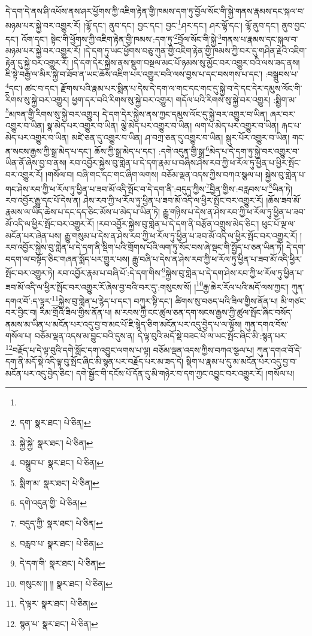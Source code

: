 དེ་དག་དེ་ནས་ཤི་འཕོས་ནས་ཤར་ཕྱོགས་ཀྱི་འཇིག་རྟེན་གྱི་ཁམས་དག་ཏུ་བྱོལ་སོང་གི་སྐྱེ་གནས་རྣམས་དང་སྐལ་བ་མཉམ་པར་སྐྱེ་བར་འགྱུར་རོ། །ལྷོ་དང་། ནུབ་དང་། བྱང་དང་། བྱང་\footnote{}ཤར་དང་། ཤར་ལྷོ་དང་། ལྷོ་ནུབ་དང་། ནུབ་བྱང་དང་། འོག་དང་། སྟེང་གི་ཕྱོགས་ཀྱི་འཇིག་རྟེན་གྱི་ཁམས་:དག་ཏུ་\footnote{དག་  སྣར་ཐང་།  པེ་ཅིན། }བྱོལ་སོང་གི་སྐྱེ་\footnote{སྐྱེ་སྐྱེ་  སྣར་ཐང་།  པེ་ཅིན། }གནས་པ་རྣམས་དང་སྐལ་བ་མཉམ་པར་སྐྱེ་བར་འགྱུར་རོ། །དེ་དག་ཏུ་ཡང་ཕྱོགས་བཅུ་ཀུན་གྱི་འཇིག་རྟེན་གྱི་ཁམས་ཀྱི་བར་དུ་གཤིན་རྗེའི་འཇིག་རྟེན་དུ་སྐྱེ་བར་འགྱུར་རོ། །དེ་དག་དེར་སྐྱེས་ནས་སྡུག་བསྔལ་མང་པོ་ཉམས་སུ་མྱོང་བར་འགྱུར་བའི་ལས་ཟད་ནས། ཇི་སྟེ་བརྒྱ་ལ་མིར་སྐྱེ་བ་ཐོབ་ན་ཡང་ཆོས་འཇིག་པར་འགྱུར་བའི་ལས་བྱས་པ་དང་བསགས་པ་དང་། :བསྒྲུབས་པ་\footnote{བསྒྲུབ་པ་  སྣར་ཐང་།  པེ་ཅིན། }དང་། ཚང་བ་དང་། རྫོགས་པའི་རྣམ་པར་སྨིན་པ་དེས་དེ་དག་ལ་གང་དང་གང་དུ་སྐྱེ་བ་དེ་དང་དེར་དམུས་ལོང་གི་རིགས་སུ་སྐྱེ་བར་འགྱུར། ཕྱག་དར་བའི་རིགས་སུ་སྐྱེ་བར་འགྱུར། གདོལ་པའི་རིགས་སུ་སྐྱེ་བར་འགྱུར། :སྨྱིག་མ་\footnote{སྨིག་མ་  སྣར་ཐང་།  པེ་ཅིན། }མཁན་གྱི་རིགས་སུ་སྐྱེ་བར་འགྱུར། དེ་དག་དེར་སྐྱེས་ནས་ཀྱང་དམུས་ལོང་དུ་སྐྱེ་བར་འགྱུར་བ་ཡིན། ཞར་བར་འགྱུར་བ་ཡིན། སྣ་མེད་པར་འགྱུར་བ་ཡིན། ལྕེ་མེད་པར་འགྱུར་བ་ཡིན། ལག་པ་མེད་པར་འགྱུར་བ་ཡིན། རྐང་པ་མེད་པར་འགྱུར་བ་ཡིན། མཛེ་ཅན་དུ་འགྱུར་བ་ཡིན། ཤ་བཀྲ་ཅན་དུ་འགྱུར་བ་ཡིན། སྒུར་པོར་འགྱུར་བ་ཡིན། གང་ན་སངས་རྒྱས་ཀྱི་སྒྲ་མེད་པ་དང་། ཆོས་ཀྱི་སྒྲ་མེད་པ་དང་། :དགེ་འདུན་གྱི་སྒྲ་\footnote{དགེ་འདུན་གྱི་  པེ་ཅིན། }མེད་པ་དེ་དག་ཏུ་སྐྱེ་བར་འགྱུར་བ་ཡིན་ནོ་ཞེས་བྱ་བ་ནས། རབ་འབྱོར་སྐྱེས་བུ་གླེན་པ་དེ་དག་རྣམ་པ་བཞིས་ཤེས་རབ་ཀྱི་ཕ་རོལ་ཏུ་ཕྱིན་པ་ཕྱིར་སྤོང་བར་འགྱུར་རོ། །གསོལ་བ། བཞི་གང་དང་གང་ཞིག་ལགས། བཅོམ་ལྡན་འདས་ཀྱིས་བཀའ་སྩལ་པ། སྐྱེས་བུ་གླེན་པ་གང་ཤེས་རབ་ཀྱི་ཕ་རོལ་ཏུ་ཕྱིན་པ་ཟབ་མོ་འདི་སྤོང་བ་དེ་དག་ནི་:བདུད་ཀྱིས་\footnote{བདུད་ཀྱི་  སྣར་ཐང་།  པེ་ཅིན། }བྱིན་གྱིས་:བརླབས་པ་\footnote{བརླབ་པ་  སྣར་ཐང་།  པེ་ཅིན། }ཡིན་ཏེ། རབ་འབྱོར་རྒྱུ་དང་པོ་དེས་ན། ཤེས་རབ་ཀྱི་ཕ་རོལ་ཏུ་ཕྱིན་པ་ཟབ་མོ་འདི་ལ་ཕྱིར་སྤོང་བར་འགྱུར་རོ། །ཆོས་ཟབ་མོ་རྣམས་ལ་ཡིད་ཆེས་པ་དང་དད་ཅིང་མོས་པ་མེད་པ་ཡིན་ཏེ། རྒྱུ་གཉིས་པ་དེས་ན་ཤེས་རབ་ཀྱི་ཕ་རོལ་ཏུ་ཕྱིན་པ་ཟབ་མོ་འདི་ལ་ཕྱིར་སྤོང་བར་འགྱུར་རོ། །རབ་འབྱོར་སྐྱེས་བུ་གླེན་པ་དེ་དག་ནི་བརྩོན་འགྲུས་མེད་ཅིང་། ཕུང་པོ་ལྔ་ལ་མངོན་པར་ཞེན་པས། རྒྱུ་གསུམ་པ་དེས་ན་ཤེས་རབ་ཀྱི་ཕ་རོལ་ཏུ་ཕྱིན་པ་ཟབ་མོ་འདི་ལ་ཕྱིར་སྤོང་བར་འགྱུར་རོ། །རབ་འབྱོར་སྐྱེས་བུ་གླེན་པ་དེ་དག་ནི་སྡིག་པའི་གྲོགས་པོའི་ལག་ཏུ་སོང་བས་ཞེ་སྡང་གི་སྤྱོད་པ་ཅན་ཡིན་ཏེ། དེ་དག་བདག་ལ་བསྟོད་ཅིང་གཞན་སྨོད་པར་གྱུར་པས། རྒྱུ་བཞི་པ་དེས་ན་ཤེས་རབ་ཀྱི་ཕ་རོལ་ཏུ་ཕྱིན་པ་ཟབ་མོ་འདི་ཕྱིར་སྤོང་བར་འགྱུར་ཏེ། རབ་འབྱོར་རྣམ་པ་བཞི་པོ་:དེ་དག་གིས་\footnote{དེ་དག་གི་  སྣར་ཐང་།  པེ་ཅིན། }སྐྱེས་བུ་གླེན་པ་དེ་དག་ཤེས་རབ་ཀྱི་ཕ་རོལ་ཏུ་ཕྱིན་པ་ཟབ་མོ་འདི་ལ་ཕྱིར་སྤོང་བར་འགྱུར་རོ་ཞེས་བྱ་བའི་བར་དུ་:གསུངས་སོ། །\footnote{གསུངས་།། །།  སྣར་ཐང་།  པེ་ཅིན། }རྒྱ་ཆེར་རོལ་པའི་མདོ་ལས་ཀྱང་། ཀུན་དགའ་བོ་:ད་ལྟར་\footnote{དེ་ལྟར་  སྣར་ཐང་།  པེ་ཅིན། }སྐྱེས་བུ་གླེན་པ་རྙེད་པ་དང་། བཀུར་སྟི་དང་། ཚིགས་སུ་བཅད་པའི་ཟིལ་གྱིས་ནོན་པ། མི་གཙང་བར་བྱིང་བ། རིམ་གྲོའི་ཟིལ་གྱིས་ནོན་པ། མ་རབས་ཀྱི་ངང་ཚུལ་ཅན་དག་སངས་རྒྱས་ཀྱི་ཚུལ་སྤོང་ཞིང་བསོད་ནམས་མ་ཡིན་པ་མངོན་པར་འདུ་བྱ་བ་མང་པོ་ཇི་སྙེད་ཅིག་མངོན་པར་འདུ་བྱེད་པ་ལ་ལྟོས། ཀུན་དགའ་བོས་གསོལ་པ། བཅོམ་ལྡན་འདས་མ་བྱུང་བའི་དུས་ན། དེ་ལྟ་བུའི་མདོ་སྡེ་བཟང་པོ་ལ་ཡང་སྤོང་ཞིང་མི་:སྙན་པར་\footnote{སྙན་པ་  སྣར་ཐང་།  པེ་ཅིན། }བརྗོད་པ་དེ་ལྟ་བུའི་དགེ་སློང་དག་འབྱུང་ལགས་པ་ལྟ། བཅོམ་ལྡན་འདས་ཀྱིས་བཀའ་སྩལ་པ། ཀུན་དགའ་བོ་དེ་དག་ནི་མདོ་སྡེ་འདི་ལྟ་བུ་སྤོང་ཞིང་མི་སྙན་པར་བརྗོད་པར་མ་ཟད་དེ། སྡིག་པ་རྣམ་པ་དུ་མ་མངོན་པར་འདུ་བྱ་བ་མངོན་པར་འདུ་བྱེད་ཅིང་། དགེ་སྦྱོང་གི་དངོས་པོ་དོན་དུ་མི་གཉེར་བ་དག་ཀྱང་འབྱུང་བར་འགྱུར་རོ། །གསོལ་པ། 